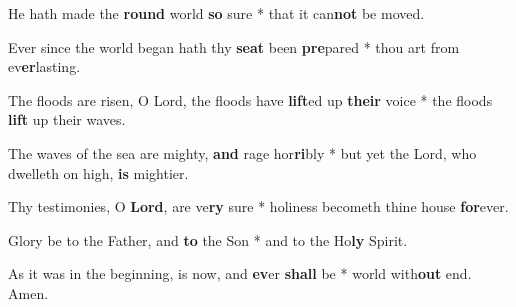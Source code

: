 \begin{multicols}{2}
	He hath made the \textbf{round} world \textbf{so} sure * that it can\textbf{not} be moved.
	
	Ever since the world began hath thy \textbf{seat} been \textbf{pre}pared * thou art from ev\textbf{er}lasting.
	
	The floods are risen, O Lord, the floods have \textbf{lift}ed up \textbf{their} voice * the floods \textbf{lift} up their waves.
	
	The waves of the sea are mighty, \textbf{and} rage hor\textbf{ri}bly * but yet the Lord, who dwelleth on high, \textbf{is} mightier.
	
	Thy testimonies, O \textbf{Lord}, are ve\textbf{ry} sure * holiness becometh thine house \textbf{for}ever.
	
	Glory be to the Father, and \textbf{to} the Son * and to the Ho\textbf{ly} Spirit.
	
	As it was in the beginning, is now, and \textbf{ev}er \textbf{shall} be * world with\textbf{out} end. Amen.
\end{multicols}